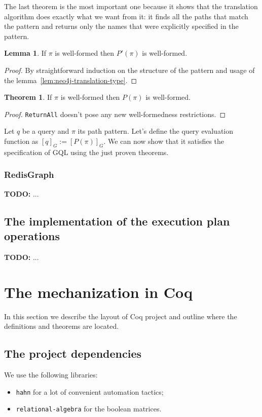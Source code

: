 \documentclass[14pt]{constructor-thesis}
\theoremstyle{definition}
\newtheorem{theorem}{Theorem}
\newtheorem{lemma}{Lemma}
\newcommand{\todo}[1]{
  \begin{tcolorbox}[colframe=red!75!black,colback=red!5!white,arc=0pt,fonttitle=\bfseries]
  \textbf{TODO:} #1
  \end{tcolorbox}
}
\begin{document}
The last theorem is the most important one because it shows that the translation algorithm does exactly what we want from it: it finds all the paths that match the pattern and returns only the names that were explicitly specified in the pattern.

\begin{lemma}
  If $\pi$ is well-formed then $P'(\pi)$ is well-formed.
\end{lemma}
\begin{proof}
  By straightforward induction on the structure of the pattern and usage of the lemma~\ref{lem:neo4j-translation-type}.
\end{proof}

\begin{theorem}
  If $\pi$ is well-formed then $P(\pi)$ is well-formed.
\end{theorem}
\begin{proof}
  \texttt{ReturnAll} doesn't pose any new well-formedness restrictions.
\end{proof}

Let $q$ be a query and $\pi$ its path pattern. Let's define the query evaluation function as $[q]_G := [P(\pi)]_G$. We can now show that it satisfies the specification of GQL using the just proven theorems.

\subsubsection{RedisGraph}

\todo{...}

\subsection{The implementation of the execution plan operations}

\todo{...}

\section{The mechanization in Coq}

In this section we describe the layout of Coq project and outline where the definitions and theorems are located.

\subsection{The project dependencies}

We use the following libraries:
\begin{itemize}
  \item \texttt{hahn} for a lot of convenient automation tactics;
  \item \texttt{relational-algebra} for the boolean matrices.
\end{itemize}
\end{document}

